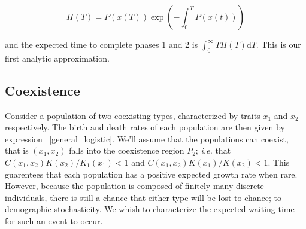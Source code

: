 \documentclass{article}
\newcommand{\ud}{\mathrm{d}}
\begin{document}
\begin{equation}
\Pi(T) = P(x(T)) \exp\left( -\int_0^T P(x(t)) \right)
\label{pdf}
\end{equation}

and the expected time to complete phases 1 and 2 is $\int_0^{\infty} T \Pi(T) \ud T$. This is our first analytic approximation.  







\subsection{Coexistence}
Consider a population of two coexisting types, characterized by traits $x_1$ and $x_2$ respectively.  The birth and death rates of each population are then given by expression ~\eqref{general_logistic}.  We'll assume that the populations can coexist, that is $(x_1, x_2)$ falls into the coexistence region $P_2$; \emph{i.e.} that $C(x_1,x_2)K(x_2) /K_1(x_1) < 1 $ and $C(x_1, x_2) K(x_1)/K(x_2) < 1$.  This guarentees that each population has a positive expected growth rate when rare.  However, because the population is composed of finitely many discrete individuals, there is still a chance that either type will be lost to chance; to demographic stochasticity.  We whish to characterize the expected waiting time for such an event to occur. 
\end{document}

